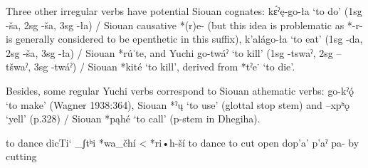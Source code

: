 \documentclass[oneside,a4paper,11pt]{article}
\newcommand{\ipa}[1]{{\phon#1}} %
\begin{document}
Three other irregular verbs have potential Siouan cognates: \ipa{kɛ́ˀę-go-ła} ‘to do’ (1sg \ipa{-ša}, 2sg \ipa{-ša}, 3sg \ipa{-ła}) / Siouan causative *(r)e- (but this idea is problematic as *-r- is generally considered to be epenthetic in this suffix), \ipa{k’alágo-ła} ‘to eat’ (1sg \ipa{-da}, 2sg \ipa{-ša}, 3sg \ipa{-ła}) / Siouan *\ipa{rú˙te}, and Yuchi go-twáˀ ‘to kill’ (1sg -tswaˀ, 2sg –tšwaˀ, 3sg -twáˀ) / Siouan *kité ‘to kill’, derived from *tˀe˙ ‘to die’. 

Besides, some regular Yuchi verbs correspond to Siouan athematic verbs: \ipa{go-kˀǫ́} ‘to make’ (Wagner 1938:364), Siouan *\ipa{ˀų} ‘to use’ (glottal stop stem) and \ipa{–xpʰǫ} ‘yell’ (p.328) / Siouan *\ipa{pąhé} ‘to call’ (p-stem in Dhegiha).   
  
 to dance	dicTi`	_ʃtʰi					*wa_čhí < *ri•h-ší	to dance
to cut open 	dop'a'	p'aˀ					pa-	by cutting
\end{document}
